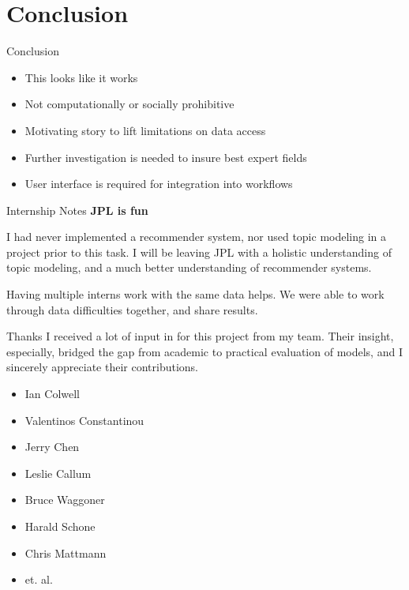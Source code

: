 \documentclass[10pt]{beamer}
\begin{document}
\section{Conclusion}

\begin{frame}{Conclusion}
  \begin{itemize}
  \item This looks like it works
  \item Not computationally or socially prohibitive
  \item Motivating story to lift limitations on data access
  \item Further investigation is needed to insure best expert fields
  \item User interface is required for integration into workflows
  \end{itemize}
\end{frame}


\begin{frame}{Internship Notes}
  {\bf JPL is fun}

  I had never implemented a recommender system, nor used topic modeling in
  a project prior to this task. I will be leaving JPL with a holistic understanding
  of topic modeling, and a much better understanding of recommender systems.

\vspace{1em}


  \vspace{1em}

  Having multiple interns work with the same data helps. We were able to work through
  data difficulties together, and share results.
\end{frame}


\begin{frame}{Thanks}
  I received a lot of input in for this project from my team.
  Their insight, especially, bridged the gap from academic to practical evaluation of models,
  and I sincerely appreciate their contributions.

  \begin{itemize}
  \item Ian Colwell
  \item Valentinos Constantinou
  \item Jerry Chen
  \item Leslie Callum
  \item Bruce Waggoner
  \item Harald Schone
  \item Chris Mattmann
  \item[] et. al.
  \end{itemize}

\end{frame}
\end{document}
